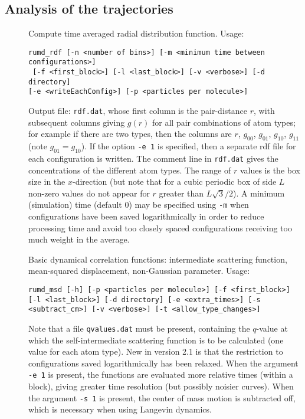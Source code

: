 \documentclass[a4paper]{article}
\begin{document}
\subsection{Analysis of the trajectories}
\begin{description}
\item[] Compute time averaged radial distribution function. Usage: 
\begin{verbatim}
rumd_rdf [-n <number of bins>] [-m <minimum time between configurations>]
 [-f <first_block>] [-l <last_block>] [-v <verbose>] [-d directory] 
[-e <writeEachConfig>] [-p <particles per molecule>]
\end{verbatim} 
Output file: \verb|rdf.dat|, whose first column is the pair-distance $r$, with
subsequent columns giving $g(r)$ for all pair combinations of atom types; 
for example if there are two types, then the columns are $r$, 
$g_{00}$, $g_{01}$, $g_{10}$, $g_{11}$ (note $g_{01}=g_{10}$). If the option 
\verb|-e 1| is specified, then a separate rdf file for each
configuration is written. The comment line in \verb|rdf.dat| gives the 
concentrations of the different atom types. The range of $r$ values is the box 
size in the $x$-direction (but note that for a cubic periodic box of side $L$ 
non-zero values  do not appear for $r$ greater than $L\sqrt{3}/2$).
A minimum (simulation) time (default 0) may be specified using \verb|-m|
when configurations have been saved logarithmically in order to reduce
 processing time and avoid too
closely spaced configurations receiving too much weight in the average.
\item[] Basic dynamical correlation functions: intermediate 
scattering function, mean-squared displacement, non-Gaussian parameter.
Usage: 
\begin{verbatim}
rumd_msd [-h] [-p <particles per molecule>] [-f <first_block>] 
[-l <last_block>] [-d directory] [-e <extra_times>] [-s <subtract_cm>] [-v <verbose>] [-t <allow_type_changes>]
\end{verbatim}
Note that a file \verb|qvalues.dat| must be present, containing the 
$q$-value at which the self-intermediate scattering function is to be
calculated (one value for each atom type). New in version 2.1 is that 
the restriction to configurations saved logarithmically has been relaxed.
When the argument \verb|-e 1| is present, the functions are evaluated more
relative times (within a block), giving greater time resolution (but
possibly noisier curves). When the argument \verb|-s 1| is present, the center of mass motion is subtracted off, which is necessary when using Langevin dynamics.

\end{description}
\end{document}
